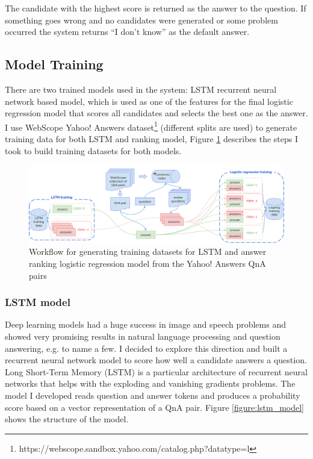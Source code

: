 \documentclass[]{article}
\begin{document}
The candidate with the highest score is returned as the answer to the question.
If something goes wrong and no candidates were generated or some problem occurred the system returns ``I don't know'' as the default answer.

\subsection{Model Training}

There are two trained models used in the system: LSTM recurrent neural network based model, which is used as one of the features for the final logistic regression model that scores all candidates and selects the best one as the answer.
I use WebScope Yahoo! Answers dataset\footnote{https://webscope.sandbox.yahoo.com/catalog.php?datatype=l} (different splits are used) to generate training data for both LSTM and ranking model, Figure \ref{figure:model_training} describes the steps I took to build training datasets for both models.

\begin{figure}
	\includegraphics[width=470px]{img/model_training}
	\caption{Workflow for generating training datasets for LSTM and answer ranking logistic regression model from the Yahoo! Answers QnA pairs}
	\label{figure:model_training}
\end{figure}

\subsubsection{LSTM model}
\label{section:lstm}

Deep learning models had a huge success in image and speech problems and showed very promising results in natural language processing and question answering, e.g. \cite{yu2014deep,diwang_lstm_2015} to name a few.
I decided to explore this direction and built a recurrent neural network model to score how well a candidate answers a question.
Long Short-Term Memory (LSTM) \cite{hochreiter1997long} is a particular architecture of recurrent neural networks that helps with the exploding and vanishing gradients problems.
The model I developed reads question and answer tokens and produces a probability score based on a vector representation of a QnA pair.
Figure \ref{figure:lstm_model} shows the structure of the model.
\end{document}
